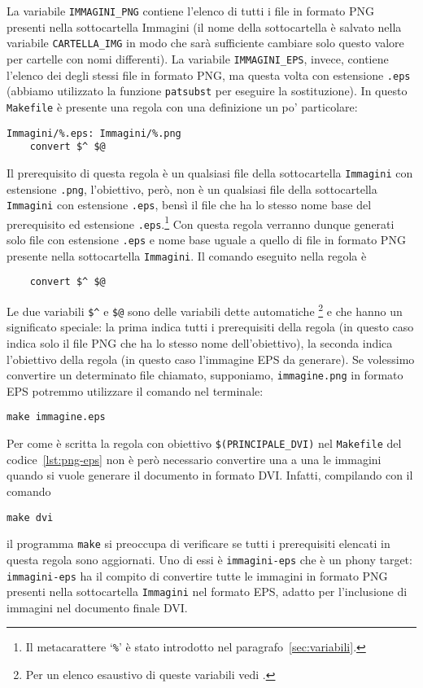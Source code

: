La variabile \verb|IMMAGINI_PNG| contiene l'elenco di tutti i file in formato
\textsc{PNG} presenti nella sottocartella Immagini (il nome della sottocartella
è salvato nella variabile \verb|CARTELLA_IMG| in modo che sarà sufficiente
cambiare solo questo valore per cartelle con nomi differenti).  La variabile
\verb|IMMAGINI_EPS|, invece, contiene l'elenco dei degli stessi file in formato
\textsc{PNG}, ma questa volta con estensione \verb|.eps| (abbiamo utilizzato la
funzione \verb|patsubst| per eseguire la sostituzione).  In questo
\verb|Makefile| è presente una regola con una definizione un po' particolare:
\begin{lstlisting}
Immagini/%.eps: Immagini/%.png
	convert $^ $@
\end{lstlisting}
Il prerequisito di questa regola è un qualsiasi file della sottocartella
\verb|Immagini| con estensione \verb|.png|, l'obiettivo, però, non è un
qualsiasi file della sottocartella \verb|Immagini| con estensione \verb|.eps|,
bensì il file che ha lo stesso nome base del prerequisito ed estensione
\verb|.eps|.\footnote{Il metacarattere `\texttt{\%}' è stato introdotto nel
  paragrafo~\ref{sec:variabili}.}
Con questa regola verranno dunque generati solo file con estensione \verb|.eps|
e nome base uguale a quello di file in formato \textsc{PNG} presente nella
sottocartella \verb|Immagini|.  Il comando eseguito nella regola è
\begin{lstlisting}
	convert $^ $@
\end{lstlisting}
Le due variabili \verb|$^| e \verb|$@| sono delle variabili dette automatiche%
\footnote{Per un elenco esaustivo di queste variabili vedi
  \textcite[112]{gnu:make}.}
e che hanno un significato speciale: la prima indica tutti i prerequisiti della
regola (in questo caso indica solo il file \textsc{PNG} che ha lo stesso nome
dell'obiettivo), la seconda indica l'obiettivo della regola (in questo caso
l'immagine \textsc{EPS} da generare).  Se volessimo convertire un determinato
file chiamato, supponiamo, \verb|immagine.png| in formato \textsc{EPS} potremmo
utilizzare il comando nel terminale:
\begin{verbatim}
make immagine.eps
\end{verbatim}
Per come è scritta la regola con obiettivo \verb|$(PRINCIPALE_DVI)|
nel \verb|Makefile| del codice~\ref{lst:png-eps} non è però necessario
convertire una a una le immagini quando si vuole generare il documento in
formato \textsc{DVI}.  Infatti, compilando con il comando
\begin{verbatim}
make dvi
\end{verbatim}
il programma \verb|make| si preoccupa di verificare se tutti i prerequisiti
elencati in questa regola sono aggiornati.  Uno di essi è \verb|immagini-eps|
che è un phony target: \verb|immagini-eps| ha il compito di convertire tutte le
immagini in formato \textsc{PNG} presenti nella sottocartella \verb|Immagini|
nel formato \textsc{EPS}, adatto per l'inclusione di immagini nel documento
finale \textsc{DVI}.

